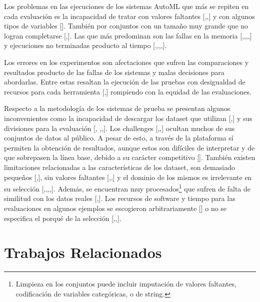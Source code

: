 Los problemas en las ejecuciones de los sistemas AutoML que más se repiten en cada evaluación es la incapacidad de tratar con valores faltantes 
[\cite{10},\cite{22},\cite{32}] y con algunos tipos de variables [\cite{30}]. También por conjuntos con un tamaño muy grande que no logran completarse 
[\cite{12},\cite{22}]. Las que más predominan son las fallas en la memoria [\cite{10},\cite{11},\cite{12},\cite{22},\cite{29}] y ejecuciones no terminadas producto al 
tiempo [\cite{10},\cite{12},\cite{19},\cite{20},\cite{29}].

Los errores en los experimentos son afectaciones que sufren las comparaciones y resultados producto de las fallas de los sistemas y malas decisiones para abordarlas. 
Entre estas resaltan la ejecución de las pruebas con desigualdad de recursos para cada herramienta [\cite{10},\cite{25}] rompiendo con la equidad de las evaluaciones.

Respecto a la metodología de los sistemas de prueba se presentan algunos inconvenientes como la incapacidad de descargar los dataset que utilizan [\cite{14},\cite{32}] y 
sus divisiones para la evaluación [\cite{10}, \cite{14},\cite{16},\cite{34}]. Los challenges [\cite{11},\cite{12},\cite{29}] ocultan muchos de sus conjuntos de datos 
al público. A pesar de esto, a través de la plataforma sí permiten la obtención de resultados, aunque estos son difíciles de interpretar y de que sobrepasen la línea 
base, debido a su carácter competitivo [\cite{31}]. También existen limitaciones relacionadas a las características de los dataset, son demasiado pequeños 
[\cite{15},\cite{23}], sin valores faltantes [\cite{18},\cite{24},\cite{25}] y el dominio de los mismos es irrelevante en su selección 
[\cite{10},\cite{16},\cite{18},\cite{22},\cite{31}]. Además, se encuentran muy procesados\footnote{Limpieza en los conjuntos puede incluir imputación de valores 
faltantes, codificación de variables categóricas, o de string.} que sufren de falta de similitud con los datos reales [\cite{18},\cite{22}]. Los recursos de software y 
tiempo para las evaluaciones en algunos ejemplos se escogieron arbitrariamente [\cite{8}] o no se especifica el porqué de la selección [\cite{13},\cite{22},\cite{24}].

\section{Trabajos Relacionados}\label{section:trabajos_relacionados}

